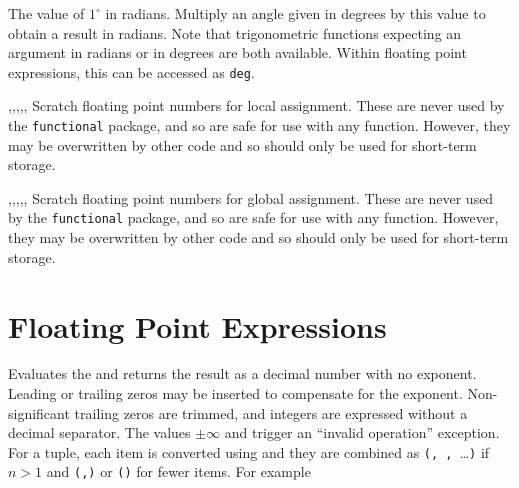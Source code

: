 \documentclass[oneside]{book}
\begin{document}
\begin{variable}{\cOneDegreeFp}
The value of $1^{\circ}$ in radians. Multiply an angle given in
degrees by this value to obtain a result in radians.  Note that
trigonometric functions expecting an argument in radians or in
degrees are both available.  Within floating point expressions, this
can be accessed as \texttt{deg}.
\end{variable}

\begin{variable}{\lTmpaFp,\lTmpbFp,\lTmpcFp,\lTmpiFp,\lTmpjFp,\lTmpkFp}
Scratch floating point numbers for local assignment. These are never used by
the \verb!functional! package, and so are safe for use with any
function. However, they may be overwritten by other
code and so should only be used for short-term storage.
\end{variable}

\begin{variable}{\gTmpaFp,\gTmpbFp,\gTmpcFp,\gTmpiFp,\gTmpjFp,\gTmpkFp}
Scratch floating point numbers for global assignment. These are never used by
the \verb!functional! package, and so are safe for use with any
function. However, they may be overwritten by other
code and so should only be used for short-term storage.
\end{variable}

\section{Floating Point Expressions}

\begin{function}{\FpEval}
\begin{syntax}
 
\end{syntax}
Evaluates the  and returns the
result as a decimal number with no
exponent.  Leading or trailing zeros may be inserted to compensate
for the exponent.  Non-significant trailing zeros are trimmed, and
integers are expressed without a decimal separator.  The values
$\pm\infty$ and \nan{} trigger an \enquote{invalid operation}
exception.
For a tuple, each item is converted using  and they are combined as
\verb|(|\verb*|, |\verb*|, |\ldots{}\verb|)|
if $n>1$ and \verb|(|\verb|,)| or \verb|()| for fewer items.
For example
\begin{demohigh}
\end{demohigh}
\end{function}
\end{document}
